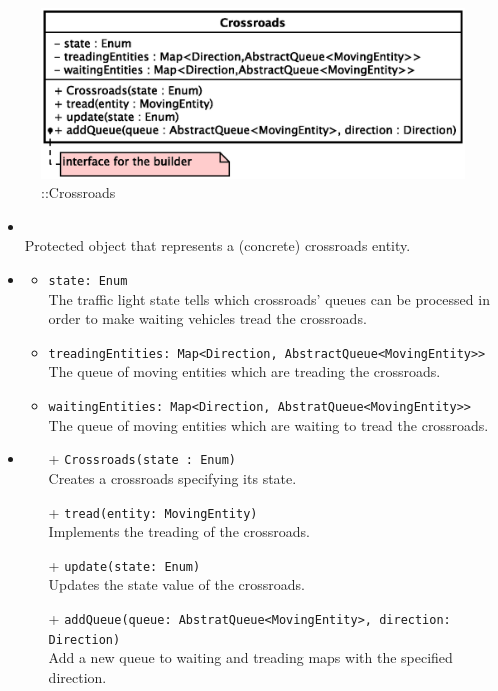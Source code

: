 \begin{figure}[h]
\centering
\includegraphics[scale=0.6,keepaspectratio]{images/solution/app/backend/crossroads.eps}
\caption{\pReactiveComponent::Crossroads}
\label{fig:sd-app-crossroads}
\end{figure}
\FloatBarrier
\begin{itemize}
  \item \textbf{\descr} \\
    Protected object that represents a (concrete) crossroads entity.
  \item \textbf{\attrs}
  \begin{itemize}
    \item \texttt{state: Enum} \\
The traffic light state tells which crossroads' queues can be processed in
order to make waiting vehicles tread the crossroads.
    \item \texttt{treadingEntities: Map<Direction, AbstractQueue<MovingEntity>>} \\
The queue of moving entities which are treading the crossroads.
    \item \texttt{waitingEntities: Map<Direction, AbstratQueue<MovingEntity>>} \\
The queue of moving entities which are waiting to tread the crossroads. 
  \end{itemize}
  \item \textbf{\ops}
  \begin{itemize}
    \item[+] \texttt{Crossroads(state : Enum)} \\
Creates a crossroads specifying its state.
    \item[+] \texttt{tread(entity: MovingEntity)} \\
Implements the treading of the crossroads.
    \item[+] \texttt{update(state: Enum)} \\
Updates the state value of the crossroads.
    \item[+] \texttt{addQueue(queue: AbstratQueue<MovingEntity>, direction: 
Direction)} \\
Add a new queue to waiting and treading maps with the specified direction.
  \end{itemize}
\end{itemize}
